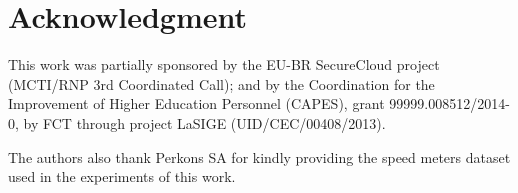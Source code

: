 \documentclass[journal]{IEEEtran}
\begin{document}

\section*{Acknowledgment}
This work was partially sponsored by the EU-BR SecureCloud project (MCTI/RNP 3rd Coordinated Call); and by the Coordination for the Improvement of Higher Education Personnel (CAPES), grant 99999.008512/2014-0, by FCT through project LaSIGE (UID/CEC/00408/2013).

The authors also thank Perkons SA for kindly providing the speed meters dataset used in the experiments of this work.
\end{document}
